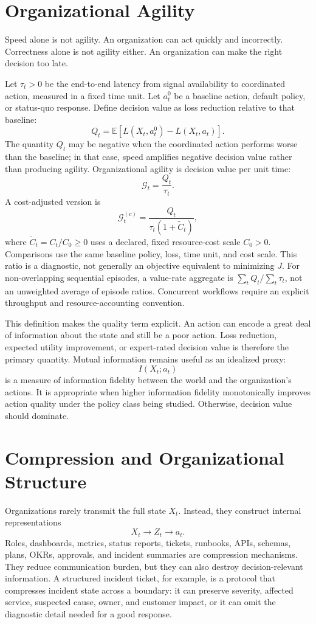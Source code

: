 \documentclass[11pt]{article}
\newcommand{\E}{\mathbb{E}}
\newcommand{\calG}{\mathcal{G}}
\begin{document}
\section{Organizational Agility}

Speed alone is not agility. An organization can act quickly and incorrectly.
Correctness alone is not agility either. An organization can make the right
decision too late.

Let \(\tau_t>0\) be the end-to-end latency from signal availability to
coordinated action, measured in a fixed time unit. Let \(a_t^0\) be a baseline action, default policy, or status-quo
response. Define decision value as loss reduction relative to that baseline:
\[
Q_t=\E\left[L(X_t,a_t^0)-L(X_t,a_t)\right].
\]
The quantity \(Q_t\) may be negative when the coordinated action performs
worse than the baseline; in that case, speed amplifies negative decision value
rather than producing agility.
Organizational agility is decision value per unit time:
\[
\calG_t=\frac{Q_t}{\tau_t}.
\]
A cost-adjusted version is
\[
\calG_t^{(c)}=\frac{Q_t}{\tau_t(1+\widetilde C_t)},
\]
where \(\widetilde C_t=C_t/C_0\geq 0\) uses a declared, fixed resource-cost
scale \(C_0>0\). Comparisons use the same baseline policy, loss, time unit,
and cost scale. This ratio is a diagnostic, not generally an objective
equivalent to minimizing \(J\). For non-overlapping sequential episodes, a
value-rate aggregate is \(\sum_t Q_t/\sum_t\tau_t\), not an unweighted
average of episode ratios. Concurrent workflows require an explicit
throughput and resource-accounting convention.

This definition makes the quality term explicit. An action can encode a great
deal of information about the state and still be a poor action. Loss reduction,
expected utility improvement, or expert-rated decision value is therefore the
primary quantity. Mutual information remains useful as an idealized proxy:
\[
I(X_t;a_t)
\]
is a measure of information fidelity between the world and the organization's
actions. It is appropriate when higher information fidelity monotonically
improves action quality under the policy class being studied. Otherwise,
decision value should dominate.

\section{Compression and Organizational Structure}

Organizations rarely transmit the full state \(X_t\). Instead, they construct
internal representations
\[
X_t \rightarrow Z_t \rightarrow a_t.
\]
Roles, dashboards, metrics, status reports, tickets, runbooks, APIs, schemas,
plans, OKRs, approvals, and incident summaries are compression mechanisms. They
reduce communication burden, but they can also destroy decision-relevant
information. A structured incident ticket, for example, is a protocol that
compresses incident state across a boundary: it can preserve severity, affected
service, suspected cause, owner, and customer impact, or it can omit the
diagnostic detail needed for a good response.
\end{document}
